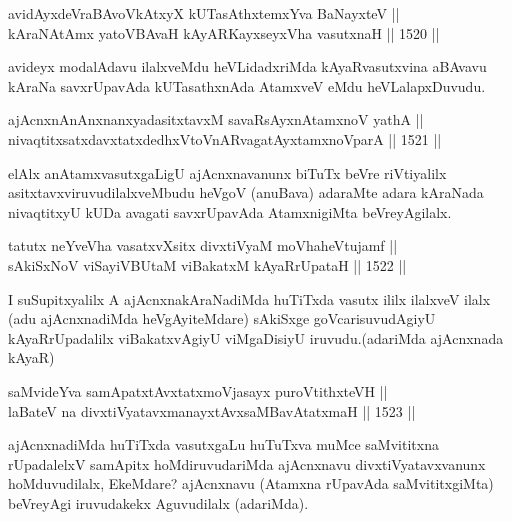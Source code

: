 \begin{shl}
avidAyxdeVraBAvoVkAtxyX kUTasAthxtemxYva BaNayxteV ||  \\
kAraNAtAmx yatoV\s BAvaH kAyARKayxseyxVha vasutxnaH \hfill || 1520 ||  
\end{shl}

\begin{artha}
avideyx modalAdavu ilalxveMdu heVLidadxriMda kAyaRvasutxvina aBAvavu kAraNa savxrUpavAda kUTasathxnAda AtamxveV eMdu heVLalapxDuvudu.
\end{artha}


\begin{shl}
ajAcnxnAnAnxnanxyadasitxtavxM savaRsAyxnAtamxnoV yathA ||  \\
nivaqtitxsatxdavxtatxdedhxVtoVnARvagatAyxtamxnoV\s parA \hfill || 1521 ||  
\end{shl}

\begin{artha}
elAlx anAtamxvasutxgaLigU ajAcnxnavanunx biTuTx beVre riVtiyalilx asitxtavxviruvudilalxveMbudu heVgoV (anuBava) adaraMte adara kAraNada nivaqtitxyU kUDa avagati savxrUpavAda AtamxnigiMta beVreyAgilalx.
\end{artha}

\begin{shl}
tatutx neYveVha vasatxvXsitx divxtiVyaM moVhaheVtujamf || \\
sAkiSxNoV viSayiVBUtaM viBakatxM kAyaRrUpataH \hfill || 1522 ||  
\end{shl}

\begin{artha}
I suSupitxyalilx A ajAcnxnakAraNadiMda huTiTxda vasutx ililx ilalxveV ilalx (adu ajAcnxnadiMda heVgAyiteMdare) sAkiSxge goVcarisuvudAgiyU kAyaRrUpadalilx viBakatxvAgiyU viMgaDisiyU iruvudu.(adariMda ajAcnxnada kAyaR)
\end{artha}

\begin{shl}
saMvideYva samApatxtAvxtatxmoVjasayx puroVtithxteVH ||  \\
laBateV na divxtiVyatavxmanayxtAvxsaMBavAtatxmaH \hfill || 1523 ||  
\end{shl}

\begin{artha}
ajAcnxnadiMda huTiTxda vasutxgaLu huTuTxva muMce saMvititxna rUpadalelxV samApitx hoMdiruvudariMda ajAcnxnavu divxtiVyatavxvanunx hoMduvudilalx, EkeMdare? ajAcnxnavu (Atamxna rUpavAda saMvititxgiMta) beVreyAgi iruvudakekx Aguvudilalx (adariMda).
\end{artha}

